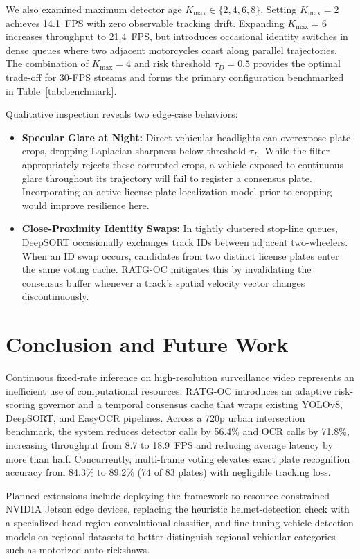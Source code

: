 We also examined maximum detector age $K_{\max} \in \{2, 4, 6, 8\}$. Setting $K_{\max}=2$ achieves 14.1~FPS with zero observable tracking drift. Expanding $K_{\max}=6$ increases throughput to 21.4~FPS, but introduces occasional identity switches in dense queues where two adjacent motorcycles coast along parallel trajectories. The combination of $K_{\max}=4$ and risk threshold $\tau_D=0.5$ provides the optimal trade-off for 30-FPS streams and forms the primary configuration benchmarked in Table~\ref{tab:benchmark}.

Qualitative inspection reveals two edge-case behaviors:
\begin{itemize}
  \item \textbf{Specular Glare at Night:} Direct vehicular headlights can overexpose plate crops, dropping Laplacian sharpness below threshold $\tau_L$. While the filter appropriately rejects these corrupted crops, a vehicle exposed to continuous glare throughout its trajectory will fail to register a consensus plate. Incorporating an active license-plate localization model prior to cropping would improve resilience here.
  \item \textbf{Close-Proximity Identity Swaps:} In tightly clustered stop-line queues, DeepSORT occasionally exchanges track IDs between adjacent two-wheelers. When an ID swap occurs, candidates from two distinct license plates enter the same voting cache. RATG-OC mitigates this by invalidating the consensus buffer whenever a track's spatial velocity vector changes discontinuously.
\end{itemize}

\section{Conclusion and Future Work}
Continuous fixed-rate inference on high-resolution surveillance video represents an inefficient use of computational resources. RATG-OC introduces an adaptive risk-scoring governor and a temporal consensus cache that wraps existing YOLOv8, DeepSORT, and EasyOCR pipelines. Across a 720p urban intersection benchmark, the system reduces detector calls by 56.4\% and OCR calls by 71.8\%, increasing throughput from 8.7 to 18.9~FPS and reducing average latency by more than half. Concurrently, multi-frame voting elevates exact plate recognition accuracy from 84.3\% to 89.2\% (74 of 83 plates) with negligible tracking loss.

Planned extensions include deploying the framework to resource-constrained NVIDIA Jetson edge devices, replacing the heuristic helmet-detection check with a specialized head-region convolutional classifier, and fine-tuning vehicle detection models on regional datasets to better distinguish regional vehicular categories such as motorized auto-rickshaws.





